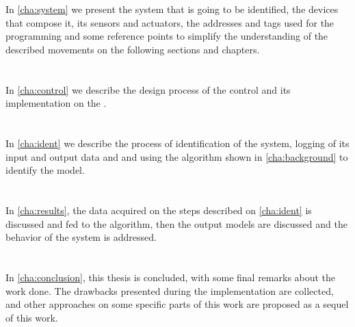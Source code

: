 \paragraph{} ~\\
In \autoref{cha:system} we present the system that is going to be identified,
the devices that compose it, its sensors and actuators, the addresses and tags
used for the programming and some reference points to simplify the understanding
of the described movements on the following sections and chapters.


\paragraph{} ~\\
In \autoref{cha:control} we describe the design process of the control and its
implementation on the \PLCs.

\paragraph{} ~\\
In \autoref{cha:ident} we describe the process of identification of the system,
logging of its input and output data and
and using the algorithm shown in
\autoref{cha:background} to identify the model.

\paragraph{} ~\\
In \autoref{cha:results}, the data acquired on the steps described on
\autoref{cha:ident} is discussed and fed to the algorithm, then the
output models are discussed and the behavior of the system is addressed.


\paragraph{} ~\\
In \autoref{cha:conclusion}, this thesis is concluded, with some final remarks
about the work done. The drawbacks presented during the implementation are
collected, and other approaches on some specific parts of this work are proposed
as a sequel of this work.


